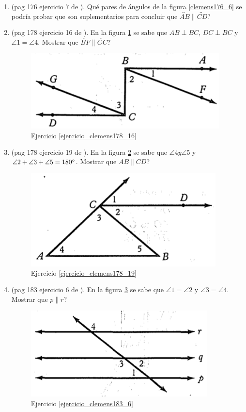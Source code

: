 \begin{enumerate}
	\item \label{ejercicio_clemens176_7} (pag 176 ejercicio 7 de \cite{clemens}). Qué pares de ángulos de la figura \ref{clemens176_6} se podría probar que son suplementarios para concluir que $\overleftrightarrow{AB}\parallel \overleftrightarrow{CD}$?
	
	\item  \label{ejercicio_clemens178_16} (pag 178 ejercicio 16 de \cite{clemens}). En la figura \ref{clemens178_16} se sabe que $AB\perp BC$, $DC\perp BC$ y $\angle 1 = \angle 4$. Mostrar que $\overleftrightarrow{BF}\parallel \overleftrightarrow{GC}$?
	\begin{figure}[H]
		\centering
		\includegraphics[width=0.5\linewidth]{Geometria/imgs/clemens178_16}
		\caption{Ejercicio \ref{ejercicio_clemens178_16}}
		\label{clemens178_16}
	\end{figure}
	
	\item  \label{ejercicio_clemens178_19} (pag 178 ejercicio 19 de \cite{clemens}). En la figura \ref{clemens178_19} se sabe que $\angle 4 y \angle 5$ y $\angle 2 + \angle 3 + \angle 5 = 180\degree  $. Mostrar que $AB\parallel CD$?
	\begin{figure}[H]
		\centering
		\includegraphics[width=0.5\linewidth]{Geometria/imgs/clemens178_19}
		\caption{Ejercicio \ref{ejercicio_clemens178_19}}
		\label{clemens178_19}
	\end{figure}
	
	\item  \label{ejercicio_clemens183_6} (pag 183 ejercicio 6 de \cite{clemens}). En la figura \ref{clemens183_6} se sabe que $\angle 1 =  \angle 2$ y $\angle 3 =\angle 4 $. Mostrar que $p\parallel r$?
	\begin{figure}[H]
		\centering
		\includegraphics[width=0.5\linewidth]{Geometria/imgs/clemens183_6}
		\caption{Ejercicio \ref{ejercicio_clemens183_6}}
		\label{clemens183_6}
	\end{figure}
	

\end{enumerate}
